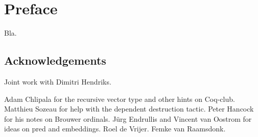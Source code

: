 \chapter*{Preface}

Bla.


\section*{Acknowledgements}

Joint work with Dimitri Hendriks.

Adam Chlipala for the recursive vector type and other hints on
Coq-club. Matthieu Sozeau for help with the dependent destruction
tactic. Peter Hancock for his notes on Brouwer ordinals. J\"urg Endrullis and
Vincent van Oostrom for ideas on pred and embeddings. Roel de Vrijer. Femke
van Raamsdonk.

